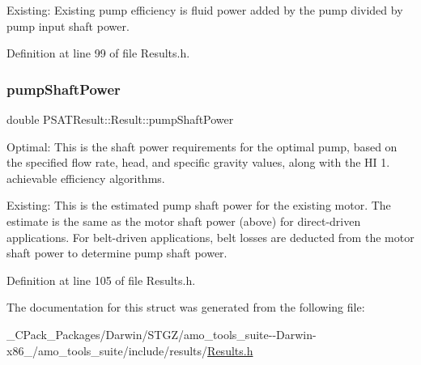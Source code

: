 Existing\+: Existing pump efficiency is fluid power added by the pump divided by pump input shaft power. 

Definition at line 99 of file Results.\+h.

\mbox{\label{struct_p_s_a_t_result_1_1_result_a6787157a580ee3755910e18e792a4dbf}} 
\subsubsection{\texorpdfstring{pump\+Shaft\+Power}{pumpShaftPower}}
{\footnotesize\ttfamily double P\+S\+A\+T\+Result\+::\+Result\+::pump\+Shaft\+Power}



Optimal\+: This is the shaft power requirements for the optimal pump, based on the specified flow rate, head, and specific gravity values, along with the HI 1. achievable efficiency algorithms. 

Existing\+: This is the estimated pump shaft power for the existing motor. The estimate is the same as the motor shaft power (above) for direct-\/driven applications. For belt-\/driven applications, belt losses are deducted from the motor shaft power to determine pump shaft power. 

Definition at line 105 of file Results.\+h.



The documentation for this struct was generated from the following file\+:\begin{DoxyCompactItemize}
\item 
\+\_\+\+C\+Pack\+\_\+\+Packages/\+Darwin/\+S\+T\+G\+Z/amo\+\_\+tools\+\_\+suite-\/-\/\+Darwin-\/x86\+\_/amo\+\_\+tools\+\_\+suite/include/results/\hyperlink{___c_pack___packages_2_darwin_2_s_t_g_z_2amo__tools__suite--_darwin-x86__64_2amo__tools__suite_2include_2results_2_results_8h}{Results.\+h}\end{DoxyCompactItemize}
